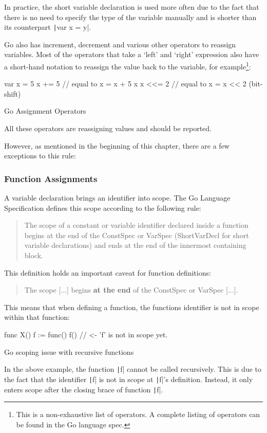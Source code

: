 In practice, the short variable declaration is used more often due to the
fact that there is no need to specify the type of the variable manually and
is shorter than its counterpart \texttt|var x = y|.

Go also has increment, decrement and various other operators to reassign
variables. Most of the operators that take a `left' and `right' expression
also have a short-hand notation to reassign the value back to the variable,
for example\footnote{This is a non-exhaustive list of operators. A complete listing
of operators can be found in the Go language spec\autocite{spec-operators}.}:


\begin{listing}
\begin{gocode}
var x = 5
x += 5 // equal to x = x + 5
x %
x <<= 2 // equal to x = x << 2 (bit-shift)
\end{gocode}
	\caption{Go Assignment Operators}
\end{listing}
All these operators are reassigning values and should be reported.

However, as mentioned in the beginning of this chapter, there are a few exceptions
to this rule:

\subsubsection{Function Assignments}\label{sec:func-reassign}

A variable declaration brings an identifier into scope. The Go Language Specification
defines this scope according to the following rule:
\begin{quote}
    The scope of a constant or variable identifier declared inside a function begins
    at the end of the ConstSpec or VarSpec (ShortVarDecl for short variable
    declarations) and ends at the end of the innermost containing block.
\autocite{spec-scope}\end{quote}

This definition holds an important caveat for function definitions:
\begin{quote}
    The scope [...] begins \textbf{at the end} of the ConstSpec or VarSpec [...].
\end{quote}

This means that when defining a function, the functions identifier is not
in scope within that function:

\begin{listing}
\begin{gocode}
func X() {
	f := func() {
		f() // <- 'f' is not in scope yet.
	}
}
\end{gocode}
	\caption{Go scoping issue with recursive functions}
\end{listing}
In the above example, the function \texttt|f| cannot be called recursively. This is due
to the fact that the identifier \texttt|f| is not in scope at \texttt|f|'s definition.
Instead, it only enters scope after the closing brace of function \texttt|f|.


